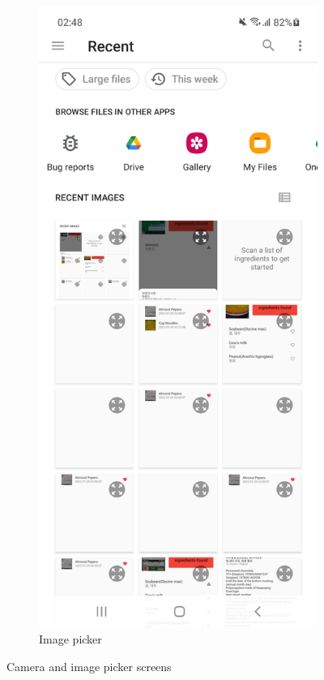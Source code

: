 \begin{figure}[h]
\begin{subfigure}{0.5\textwidth}
        \centering
        \includegraphics[width=0.9\linewidth]{Figures/Screenshot/image_picker.jpg}
        \caption{Image picker}
        \label{fig:image-picker}
    \end{subfigure}
    \caption{Camera and image picker screens}
    \label{fig:camera2}
\end{figure}

